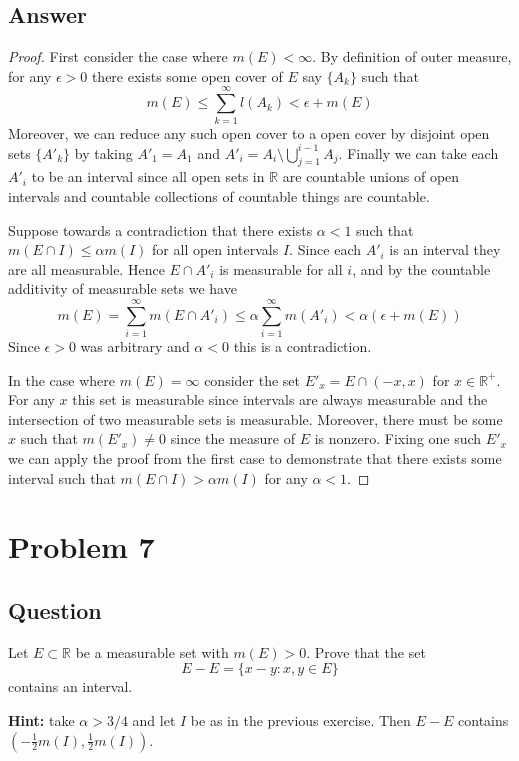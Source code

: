 \documentclass[12pt]{article}
\begin{document}
\subsection{Answer}
\begin{proof}
First consider the case where $m(E)<\infty$. By definition of outer measure, for any $\epsilon >0$ there exists some open cover of $E$ say $\{A_k\}$ such that 
\[m(E)\leq\sum_{k=1}^\infty l(A_k) <  \epsilon + m(E)\] 
Moreover, we can reduce any such open cover to a open cover by disjoint open sets $\{A'_k\}$ by taking $A'_1=A_1$ and $A'_i=A_i \setminus \bigcup_{j=1}^{i-1} A_j$. Finally we can take each $A'_i$ to be an interval since all open sets in $\mathbb{R}$ are countable unions of open intervals and countable collections of countable things are countable. 

Suppose towards a contradiction that there exists $\alpha < 1$ such that $m(E \cap I) \leq \alpha m(I)$ for all open intervals $I$. Since each $A'_i$ is an interval they are all measurable. Hence $E \cap A'_i$ is measurable for all $i$, and by the countable additivity of measurable sets we have 
\[m(E)=\sum_{i=1}^\infty m(E\cap A'_i)\leq \alpha \sum_{i=1}^\infty m(A'_i)<\alpha(\epsilon + m(E))\] 
Since $\epsilon>0$ was arbitrary and $\alpha<0$ this is a contradiction.

In the case where $m(E) = \infty$ consider the set  $E'_x=E \cap (-x,x)$ for $x \in \mathbb{R}^+$. For any $x$ this set is measurable since intervals are always measurable and the intersection of two measurable sets is measurable. Moreover, there must be some $x$ such that $m(E'_x)\neq 0$ since the measure of $E$ is nonzero. Fixing one such $E'_x$ we can apply the proof from the first case to demonstrate that there exists some interval such that $m(E \cap I)>\alpha m(I)$ for any $\alpha<1$.
\end{proof}

\section{Problem 7}
\subsection{Question}
Let $E \subset \mathbb{R}$ be a measurable set with $m(E)>0$. Prove that the set
\[E-E=\{x-y: x,y \in E\}\]
contains an interval.

{\bf Hint: }take $\alpha>3/4$ and let $I$ be as in the previous exercise. Then $E-E$ contains $(-\frac{1}{2}m(I),\frac{1}{2}m(I))$.
\end{document}
